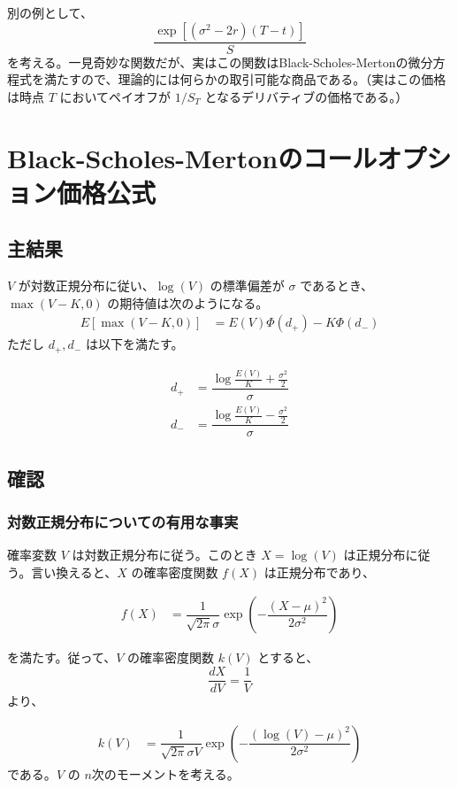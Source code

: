 \documentclass[uplatex]{jsarticle}
\begin{document}
別の例として、
$$
	\dfrac{\exp{[(\sigma^{2} - 2r)(T-t)]}}{S}
$$
を考える。一見奇妙な関数だが、実はこの関数はBlack-Scholes-Mertonの微分方程式を満たすので、理論的には何らかの取引可能な商品である。（実はこの価格は時点 $T$ においてペイオフが $1/S_{T}$ となるデリバティブの価格である。）

\section{Black-Scholes-Mertonのコールオプション価格公式}

\subsection{主結果}

$V$ が対数正規分布に従い、$\log(V)$ の標準偏差が $\sigma$ であるとき、$\max(V-K,0)$ の期待値は次のようになる。
\begin{align}
	E \left[ \max(V-K,0) \right] & = E(V) \Phi (d_{+}) - K \Phi (d_{-})
\end{align}
ただし $d_{+},d_{-}$ は以下を満たす。

\begin{align}
	d_{+} & = \dfrac{ \log \frac{E(V)}{K} + \frac{\sigma^{2}}{2} }{ \sigma } \\
	d_{-} & = \dfrac{ \log \frac{E(V)}{K} - \frac{\sigma^{2}}{2} }{ \sigma }
\end{align}


\subsection{確認}

\subsubsection{対数正規分布についての有用な事実}

確率変数 $V$ は対数正規分布に従う。このとき $X = \log(V)$ は正規分布に従う。言い換えると、$X$ の確率密度関数 $f(X)$ は正規分布であり、

\begin{align}
	f(X) & = \dfrac{1}{\sqrt{2 \pi} \sigma } \exp \left( - \dfrac{(X - \mu )^{2}}{2 \sigma^{2}} \right)
\end{align}

を満たす。従って、$V$ の確率密度関数 $k(V)$ とすると、
$$
	\dfrac{dX}{dV} = \dfrac{1}{V}
$$
より、

\begin{align}
	k(V) & = \dfrac{1}{\sqrt{2 \pi} \sigma V} \exp \left( - \dfrac{(\log{(V)}- \mu )^{2}}{2 \sigma^{2}} \right)
\end{align}
である。$V$ の $n$次のモーメントを考える。
\end{document}
